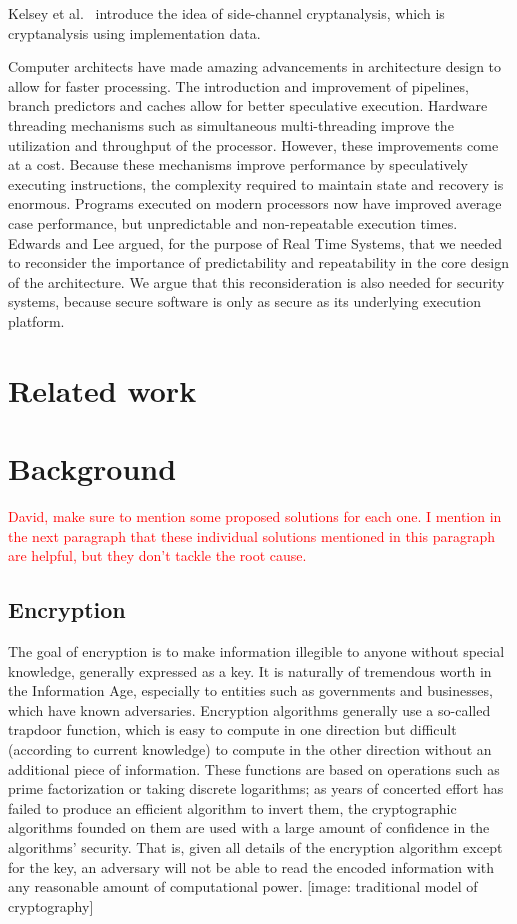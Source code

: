 \documentclass[times, 10pt,twocolumn]{article}
\begin{document}
Kelsey et al.~\cite{Kelsey98sidechannel} introduce the idea of side-channel cryptanalysis, which is cryptanalysis using implementation data. 

Computer architects have made amazing advancements in architecture design to allow for faster processing. The introduction and improvement of pipelines, branch predictors and caches allow for better speculative execution. Hardware threading mechanisms such as simultaneous multi-threading improve the utilization and throughput of the processor. However, these improvements come at a cost. Because these mechanisms improve performance by speculatively executing instructions, the complexity required to maintain state and recovery is enormous. Programs executed on modern processors now have improved average case performance, but unpredictable and non-repeatable execution times. Edwards and Lee\cite{edwards2007case} argued, for the purpose of Real Time Systems, that we needed to reconsider the importance of predictability and repeatability in the core design of the architecture. We argue that this reconsideration is also needed for security systems, because secure software is only as secure as its underlying execution platform. 


\section{Related work}

\section{Background}
\textcolor{red}{David, make sure to mention some proposed solutions for each one. I mention in the next paragraph that these individual solutions mentioned in this paragraph are helpful, but they don't tackle the root cause.}

\subsection{Encryption}
The goal of encryption is to make information illegible to anyone without special knowledge, generally expressed as a key.  It is naturally of tremendous worth in the Information Age, especially to entities such as governments and businesses, which have known adversaries.  Encryption algorithms generally use a so-called trapdoor function, which is easy to compute in one direction but difficult (according to current knowledge) to compute in the other direction without an additional piece of information.  These functions are based on operations such as prime factorization or taking discrete logarithms; as years of concerted effort has failed to produce an efficient algorithm to invert them, the cryptographic algorithms founded on them are used with a large amount of confidence in the algorithms' security.  That is, given all details of the encryption algorithm except for the key, an adversary will not be able to read the encoded information with any reasonable amount of computational power.  [image: traditional model of cryptography]
\end{document}
